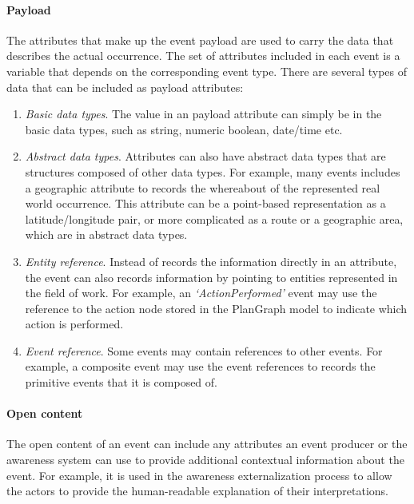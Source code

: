 \paragraph*{Payload} %
\label{par:payload}
The attributes that make up the event payload are used to carry the data that describes the actual occurrence. The set of attributes included in each event is a variable that depends on the corresponding event type. There are several types of data that can be included as payload attributes:
\begin{enumerate}
	\item \emph{Basic data types}. The value in an payload attribute can simply be in the basic data types, such as string, numeric boolean, date/time etc.
	\item \emph{Abstract data types}. Attributes can also have abstract data types that are structures composed of other data types. For example, many events includes a geographic attribute to records the whereabout of the represented real world occurrence. This attribute can be a point-based representation as a latitude/longitude pair, or more complicated as a route or a geographic area, which are in abstract data types.
	\item \emph{Entity reference}. Instead of records the information directly in an attribute, the event can also records information by pointing to entities represented in the field of work. For example, an \emph{`ActionPerformed'} event may use the reference to the action node stored in the PlanGraph model to indicate which action is performed.
	\item \emph{Event reference}. Some events may contain references to other events. For example, a composite event may use the event references to records the primitive events that it is composed of.
\end{enumerate}

\paragraph*{Open content} %
\label{par:open_content}
The open content of an event can include any attributes an event producer or the awareness system can use to provide additional contextual information about the event. For example, it is used in the awareness externalization process to allow the actors to provide the human-readable explanation of their interpretations.

